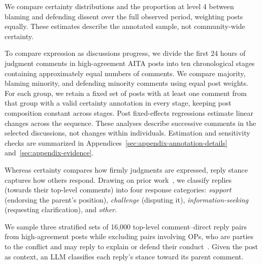We compare certainty distributions and the proportion at level 4 between
blaming and defending dissent over the full observed period, weighting
posts equally. These estimates describe the annotated sample, not
community-wide certainty.

To compare expression as discussions progress, we divide the first
24 hours of judgment comments in high-agreement AITA posts into ten
chronological stages containing approximately equal numbers of comments.
We compare majority, blaming minority, and defending
minority comments using equal post weights. For each group, we retain a
fixed set of posts with at least one comment from that group with a valid
certainty annotation in every stage, keeping post composition constant
across stages. Post fixed-effects regressions estimate linear changes
across the sequence. These analyses describe successive comments in the
selected discussions, not changes within individuals.
Estimation and sensitivity checks are summarized in
Appendices~\ref{sec:appendix-annotation-details} and~\ref{sec:appendix-evidence}.

Whereas certainty compares how firmly judgments are expressed, reply
stance captures how others respond. Drawing on prior work~\citep{andreas2012annotating}, we classify replies (towards their top-level comments) into four response categories:
\emph{support} (endorsing the parent's position), \emph{challenge}
(disputing it), \emph{information-seeking} (requesting clarification), and
\emph{other}.

We sample three stratified sets of 16,000 top-level comment--direct reply
pairs from high-agreement posts while excluding pairs involving OPs, who are parties to the conflict and may reply to explain or defend their conduct~\citep{giorgi2023author}.
Given the post as context, an LLM classifies each reply's stance toward its parent comment.

